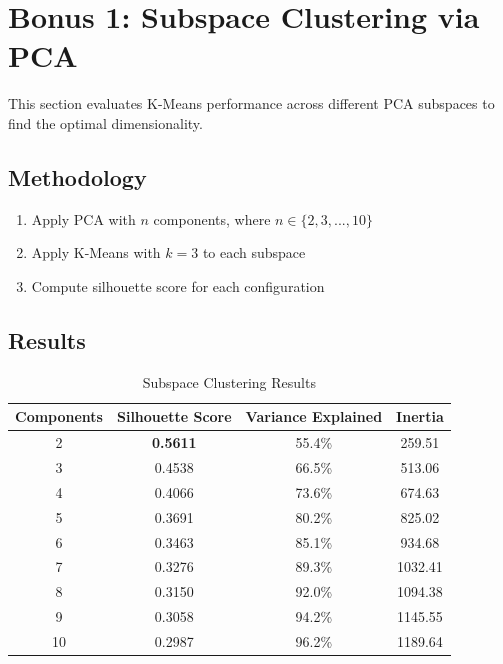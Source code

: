 \documentclass[12pt,a4paper]{article}
\begin{document}
\section{Bonus 1: Subspace Clustering via PCA}

This section evaluates K-Means performance across different PCA subspaces to find the optimal dimensionality.

\subsection{Methodology}

\begin{enumerate}
    \item Apply PCA with $n$ components, where $n \in \{2, 3, ..., 10\}$
    \item Apply K-Means with $k=3$ to each subspace
    \item Compute silhouette score for each configuration
\end{enumerate}

\subsection{Results}

\begin{table}[H]
\centering
\caption{Subspace Clustering Results}
\label{tab:subspace}
\begin{tabular}{cccc}
\toprule
\textbf{Components} & \textbf{Silhouette Score} & \textbf{Variance Explained} & \textbf{Inertia} \\
\midrule
2 & \textbf{0.5611} & 55.4\% & 259.51 \\
3 & 0.4538 & 66.5\% & 513.06 \\
4 & 0.4066 & 73.6\% & 674.63 \\
5 & 0.3691 & 80.2\% & 825.02 \\
6 & 0.3463 & 85.1\% & 934.68 \\
7 & 0.3276 & 89.3\% & 1032.41 \\
8 & 0.3150 & 92.0\% & 1094.38 \\
9 & 0.3058 & 94.2\% & 1145.55 \\
10 & 0.2987 & 96.2\% & 1189.64 \\
\bottomrule
\end{tabular}
\end{table}
\end{document}
